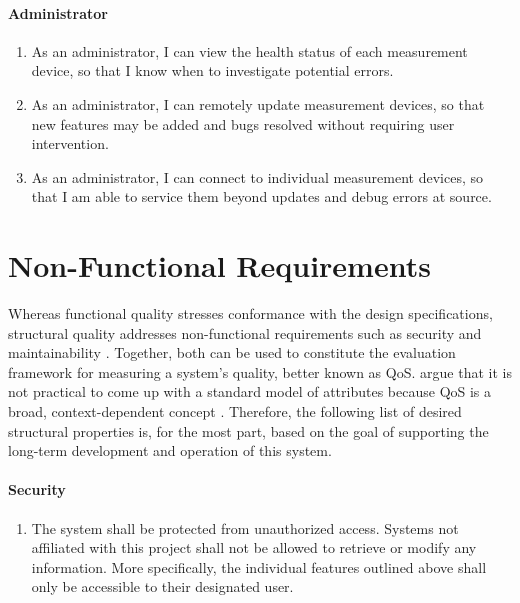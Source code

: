 \paragraph{Administrator}
\begin{enumerate}[resume, font=\sffamily,label={\textbf{FR-\protect\twodigits{\theenumi}}},leftmargin=1.4cm, ref=FR-\protect\twodigits{\theenumi}]
	\item As an administrator, I can view the health status of each measurement device, so that I know when to investigate potential errors.\label{itm:fr-view-health-status}
	\item As an administrator, I can remotely update measurement devices, so that new features may be added and bugs resolved without requiring user intervention.\label{itm:fr-update-device}
	\item As an administrator, I can connect to individual measurement devices, so that I am able to service them beyond updates and debug errors at source.\label{itm:fr-connect-to-device}
\end{enumerate}


\section{Non-Functional Requirements}
\label{sec:non-functional-requirements}

Whereas functional quality stresses conformance with the design specifications, structural quality addresses non-functional requirements such as security and maintainability \cite[p.~2]{Martinez-Ortiz:2016:QMW:3011141.3011203}. Together, both can be used to constitute the evaluation framework for measuring a system's quality, better known as \ac{QoS}. \citeauthor{Liu:2004:QCP:1013367.1013379} argue that it is not practical to come up with a standard model of attributes because \ac{QoS} is a broad, context-dependent concept \cite[p.~67]{Liu:2004:QCP:1013367.1013379}. Therefore, the following list of desired structural properties is, for the most part, based on the goal of supporting the long-term development and operation of this system.

\paragraph{Security}
\begin{enumerate}[font=\sffamily, label={\textbf{NFR-\protect\twodigits{\theenumi}}},leftmargin=1.7cm, ref=NFR-\protect\twodigits{\theenumi}]
	\item The system shall be protected from unauthorized access. Systems not affiliated with this project shall not be allowed to retrieve or modify any information. More specifically, the individual features outlined above shall only be accessible to their designated user.\label{itm:nfr-security}
\end{enumerate}

